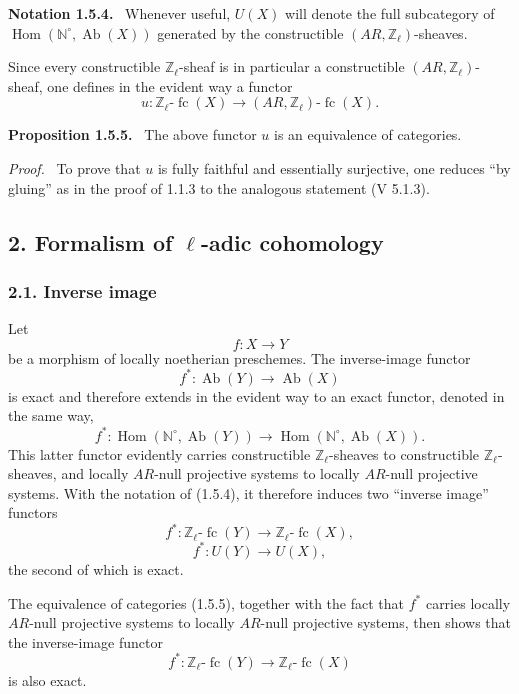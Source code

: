 \documentclass[11pt]{article}
\newenvironment{statement}[1]{\par\medskip\noindent\textbf{#1.}\ }{\par\medskip}
\newenvironment{prooftext}[1][Proof]{\par\noindent\emph{#1.}\ }{\par\medskip}
\DeclareMathOperator{\Hom}{Hom}
\providecommand{\Hom}{\operatorname{Hom}}
\providecommand{\Ab}{\operatorname{Ab}}
\providecommand{\fc}{\operatorname{fc}}
\providecommand{\Ab}{\operatorname{Ab}}
\providecommand{\Hom}{\operatorname{Hom}}
\begin{document}
\begin{statement}{Notation 1.5.4}
Whenever useful, \(U(X)\) will denote the full subcategory of \(\Hom(\mathbb N^\circ,\Ab(X))\) generated by the constructible \((AR,\mathbb Z_\ell)\)-sheaves.
\end{statement}

Since every constructible \(\mathbb Z_\ell\)-sheaf is in particular a constructible \((AR,\mathbb Z_\ell)\)-sheaf, one defines in the evident way a functor
\[
u:\mathbb Z_\ell\text{-}\fc(X)\longrightarrow (AR,\mathbb Z_\ell)\text{-}\fc(X).
\]

\begin{statement}{Proposition 1.5.5}
The above functor \(u\) is an equivalence of categories.
\end{statement}

\begin{prooftext}[Proof]
To prove that \(u\) is fully faithful and essentially surjective, one reduces ``by gluing'' as in the proof of 1.1.3 to the analogous statement (V 5.1.3).
\end{prooftext}

\subsection*{2. Formalism of \(\ell\)-adic cohomology}

\subsubsection*{2.1. Inverse image}

Let
\[
f:X\longrightarrow Y
\]
be a morphism of locally noetherian preschemes. The inverse-image functor
\[
f^*:\Ab(Y)\longrightarrow \Ab(X)
\]
is exact and therefore extends in the evident way to an exact functor, denoted in the same way,
\[
f^*:\Hom(\mathbb N^\circ,\Ab(Y))\longrightarrow \Hom(\mathbb N^\circ,\Ab(X)).
\]
This latter functor evidently carries constructible \(\mathbb Z_\ell\)-sheaves to constructible \(\mathbb Z_\ell\)-sheaves, and locally \(AR\)-null projective systems to locally \(AR\)-null projective systems. With the notation of (1.5.4), it therefore induces two ``inverse image'' functors
\[
f^*:\mathbb Z_\ell\text{-}\fc(Y)\longrightarrow \mathbb Z_\ell\text{-}\fc(X),
\]
\[
f^*:U(Y)\longrightarrow U(X),
\]
the second of which is exact.

The equivalence of categories (1.5.5), together with the fact that \(f^*\) carries locally \(AR\)-null projective systems to locally \(AR\)-null projective systems, then shows that the inverse-image functor
\[
f^*:\mathbb Z_\ell\text{-}\fc(Y)\longrightarrow \mathbb Z_\ell\text{-}\fc(X)
\]
is also exact.
\end{document}
